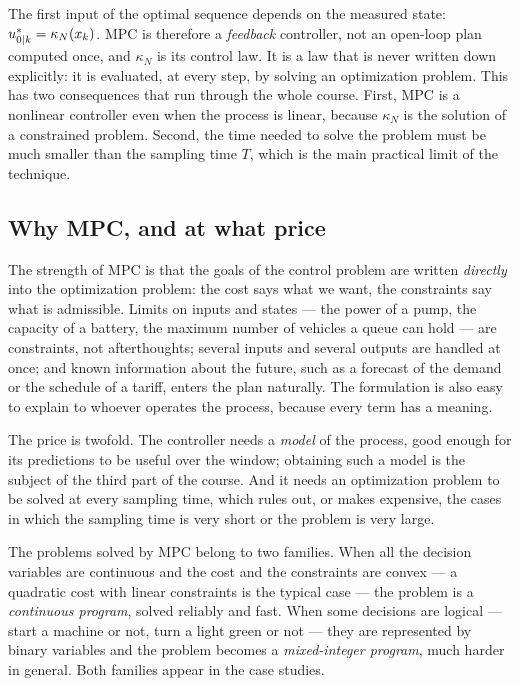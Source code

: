 The first input of the optimal sequence depends on the measured state: $u^*_{{0|k}} =
\kappa_N(x_k)$. MPC is therefore a \emph{feedback} controller, not an open-loop plan computed
once, and $\kappa_N$ is its control law. It is a law that is never written down explicitly: it is
evaluated, at every step, by solving an optimization problem. This has two consequences that run
through the whole course. First, MPC is a nonlinear controller even when the process is linear,
because $\kappa_N$ is the solution of a constrained problem. Second, the time needed to solve the
problem must be much smaller than the sampling time $T$, which is the main practical limit of
the technique.

\subsection{Why MPC, and at what price}

The strength of MPC is that the goals of the control problem are written \emph{directly} into
the optimization problem: the cost says what we want, the constraints say what is admissible.
Limits on inputs and states --- the power of a pump, the capacity of a battery, the maximum
number of vehicles a queue can hold --- are constraints, not afterthoughts; several inputs and
several outputs are handled at once; and known information about the future, such as a forecast
of the demand or the schedule of a tariff, enters the plan naturally. The formulation is also
easy to explain to whoever operates the process, because every term has a meaning.

The price is twofold. The controller needs a \emph{model} of the process, good enough for its
predictions to be useful over the window; obtaining such a model is the subject of the third
part of the course. And it needs an optimization problem to be solved at every sampling time,
which rules out, or makes expensive, the cases in which the sampling time is very short or the
problem is very large.

The problems solved by MPC belong to two families. When all the decision variables are
continuous and the cost and the constraints are convex --- a quadratic cost with linear
constraints is the typical case --- the problem is a \emph{continuous program}, solved reliably
and fast. When some decisions are logical --- start a machine or not, turn a light green or
not --- they are represented by binary variables and the problem becomes a
\emph{mixed-integer program}, much harder in general. Both families appear in the case studies.


